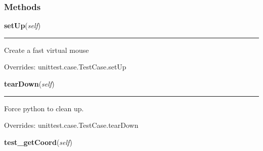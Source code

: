   \subsubsection{Methods}

    \vspace{0.5ex}

\hspace{.8\funcindent}\begin{boxedminipage}{\funcwidth}

    \raggedright \textbf{setUp}(\textit{self})

    \vspace{-1.5ex}

    \rule{\textwidth}{0.5\fboxrule}
\setlength{\parskip}{2ex}
    Create a fast virtual mouse

\setlength{\parskip}{1ex}
      Overrides: unittest.case.TestCase.setUp

    \end{boxedminipage}

    \vspace{0.5ex}

\hspace{.8\funcindent}\begin{boxedminipage}{\funcwidth}

    \raggedright \textbf{tearDown}(\textit{self})

    \vspace{-1.5ex}

    \rule{\textwidth}{0.5\fboxrule}
\setlength{\parskip}{2ex}
    Force python to clean up.

\setlength{\parskip}{1ex}
      Overrides: unittest.case.TestCase.tearDown

    \end{boxedminipage}

    \label{GUIRobot:Test:test_Virtual_HID:test_VMouse:test_getCoord}

    \vspace{0.5ex}

\hspace{.8\funcindent}\begin{boxedminipage}{\funcwidth}

    \raggedright \textbf{test\_getCoord}(\textit{self})

\setlength{\parskip}{2ex}
\setlength{\parskip}{1ex}
    \end{boxedminipage}

